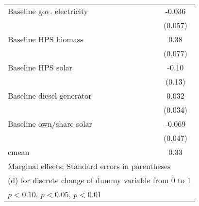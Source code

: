 \begin{table}[htbp]
\begin{tabular*}{1\hsize}{@{\hskip\tabcolsep\extracolsep\fill}l*{5}{c}}
Baseline gov. electricity&                  &                  &                  &                  &   -0.036         \\
                &                  &                  &                  &                  &  (0.057)         \\
Baseline HPS biomass&                  &                  &                  &                  &     0.38\sym{***}\\
                &                  &                  &                  &                  &  (0.077)         \\
Baseline HPS solar&                  &                  &                  &                  &    -0.10         \\
                &                  &                  &                  &                  &   (0.13)         \\
Baseline diesel generator&                  &                  &                  &                  &    0.032         \\
                &                  &                  &                  &                  &  (0.034)         \\
Baseline own/share solar&                  &                  &                  &                  &   -0.069         \\
                &                  &                  &                  &                  &  (0.047)         \\
\midrule
cmean           &                  &                  &                  &                  &     0.33         \\
\bottomrule
\multicolumn{6}{l}{\footnotesize Marginal effects; Standard errors in parentheses}\\
\multicolumn{6}{l}{\footnotesize  (d) for discrete change of dummy variable from 0 to 1}\\
\multicolumn{6}{l}{\footnotesize \sym{*} \(p<0.10\), \sym{**} \(p<0.05\), \sym{***} \(p<0.01\)}\\
\end{tabular*}
\end{table}
